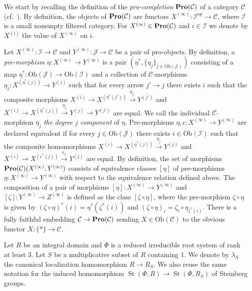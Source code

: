 \documentclass[oneside, 11pt]{amsart} \pdfoutput=1
\newcommand{\St}{\mathop{\mathrm{St}}\nolimits}
\numberwithin{equation}{section}
\theoremstyle{definition}
\newcommand{\catname}[1]{{\normalfont\textbf{#1}}} %
\begin{document}
We start by recalling the definition of the {\it pro-completion} $\catname{Pro}(\mathcal{C})$ of a category $\mathcal{C}$ (cf.~\cite[\S~2.1]{LSV20}).
By definition, the objects of $\catname{Pro}(\mathcal{C})$ are functors $X^{(\infty)}\colon\mathcal{I}^{\mathrm{op}} \to \mathcal{C}$, where $\mathcal{I}$ is a small nonempty filtered category. For $X^{(\infty)} \in 
\catname{Pro}(\mathcal{C})$ and $i \in \mathcal{I}$ we denote by $X^{(i)}$ the value of $X^{(\infty)}$ on $i$. 

Let $X^{(\infty)}\colon\mathcal{I}\to\mathcal{C}$ and $Y^{(\infty)}\colon\mathcal{J}\to\mathcal{C}$ be a pair of pro-objects.
By definition, a {\it pre-morphism} $\eta\colon X^{(\infty)} \to Y^{(\infty)}$ is a pair $(\eta^*, \{\eta_j\}_{j\in\mathrm{Ob}(\mathcal{J})})$ consisting of a map $\eta^*\colon \mathrm{Ob}(\mathcal{J})\to\mathrm{Ob}(\mathcal{I})$ and a collection of $\mathcal{C}$-morphisms $\eta_j\colon X^{(\eta^*(j))}\to Y^{(j)}$ such that for every arrow $j' \to j$ there exists $i$ such that the composite morphisms $X^{(i)} \to X^{(\eta^*(j'))} \xrightarrow{\eta_{j'}} Y^{(j')}$ and $X^{(i)} \to X^{(\eta^*(j))} \xrightarrow{\eta_j} Y^{(j)} \to Y^{(j')}$ are equal. We call the individual $\mathcal{C}$-morphism $\eta_j$ {\it the degree $j$ component} of $\eta$.
Pre-morphisms $\eta, \epsilon \colon X^{(\infty)} \to Y^{(\infty)}$ are declared equivalent if for every $j \in \mathrm{Ob}(\mathcal{J})$ there exists $i \in \mathrm{Ob}(\mathcal{I})$ such that the composite homomorphisms $X^{(i)} \to X^{(\eta^*(j))} \xrightarrow{\eta_j} Y^{(j)}$ and $X^{(i)} \to X^{(\epsilon^*(j))} \xrightarrow{\epsilon_j} Y^{(j)}$ are equal. By definition, the set of morphisms $\catname{Pro}(\mathcal{C})(X^{(\infty)}, Y^{(\infty)})$ consists of equivalence classes $[\eta]$ of pre-morphisms $\eta \colon X^{(\infty)} \to Y^{(\infty)}$ with respect to the equivalence relation defined above. The composition of a pair of morphisms \([\eta] \colon X^{(\infty)} \to Y^{(\infty)}\) and \([\zeta] \colon Y^{(\infty)} \to Z^{(\infty)}\) is defined as the class $[\zeta \circ \eta]$, where the pre-morphism \(\zeta \circ \eta\) is given by \((\zeta \circ \eta)^*(i) = \eta^*(\zeta^*(i))\) and \((\zeta\circ \eta)_{i} = \zeta_{i} \circ \eta_{\zeta^*(i)}\). There is a fully faithful embedding $\mathcal{C}\to\catname{Pro}(\mathcal{C})$ sending $X \in \mathrm{Ob}(\mathcal{C})$ to the obvious functor $X\colon \{ * \} \to \mathcal{C}$. 

Let $R$ be an integral domain and $\Phi$ is a reduced irreducible root system of rank at least $3$.
Let $S$ be a multiplicative subset of $R$ containing $1$. 
We denote by $\lambda_S$ the canonical localization homomorphism $R \to R_S$.
We also reuse the same notation for the induced homomorphism $\St(\Phi, R) \to \St(\Phi, R_S)$ of Steinberg groups.
\end{document}
